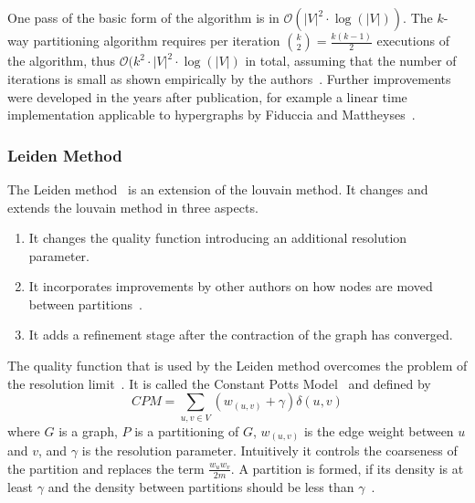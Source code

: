             One pass of the basic form of the algorithm is in $\mathcal{O}(|V|^2 \cdot \log(|V|))$. The $k$-way partitioning algorithm requires per iteration $\binom{k}{2} = \frac{k (k - 1)}{2}$ executions of the algorithm, thus $\mathcal{O}(k^2 \cdot |V|^2 \cdot \log(|V|)$ in total, assuming that the number of iterations is small as shown empirically by the authors~\autocite{kl}. Further improvements were developed in the years after publication, for example a linear time implementation applicable to hypergraphs by Fiduccia and Mattheyses~\autocite{fm}.

        \subsubsection*{Leiden Method}
            The Leiden method~\autocite{traag2019louvain} is an extension of the louvain method.
            It changes and extends the louvain method in three aspects.
            \begin{enumerate}
                \item It changes the quality function introducing an additional resolution parameter.
                \item It incorporates improvements by other authors on how nodes are moved between partitions~\autocite{movd,movc,movb,mova}.
                \item It adds a refinement stage after the contraction of the graph has converged.
            \end{enumerate}
            The quality function that is used by the Leiden method overcomes the problem of the resolution limit~\autocite{traag2011narrow, fortunato2007resolution}.
            It is called the Constant Potts Model~\autocite{potts1952some, traag2011narrow} and defined by 
            \[ CPM = \sum_{u,v \in V}(w_{(u,v)} + \gamma) \delta(u, v) \]
            where $G$ is a graph, $P$ is a partitioning of $G$, $w_{(u,v)}$ is the edge weight between $u$ and $v$, and $\gamma$ is the resolution parameter. 
            Intuitively it controls the coarseness of the partition and replaces the term $\frac{w_u w_v}{2m}$.
            A partition is formed, if its density is at least $\gamma$ and the density between partitions should be less than $\gamma$~\autocite{traag2019louvain}.
            
